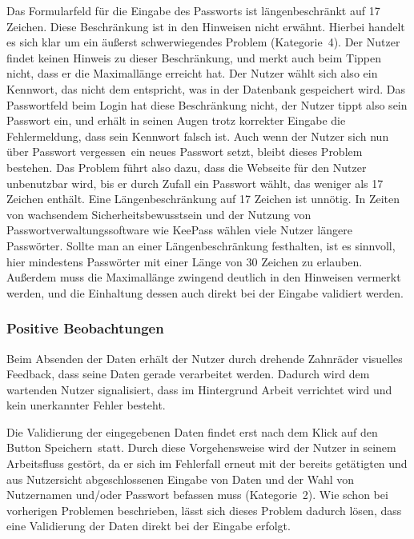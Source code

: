 {
Das Formularfeld für die Eingabe des Passworts ist längenbeschränkt auf 17 Zeichen. Diese Beschränkung ist in den Hinweisen nicht erwähnt.
}
{
Hierbei handelt es sich klar um ein äußerst schwerwiegendes Problem (Kategorie~4). Der Nutzer findet keinen Hinweis zu dieser Beschränkung, und merkt auch beim Tippen nicht, dass er die Maximallänge erreicht hat. Der Nutzer wählt sich also ein Kennwort, das nicht dem entspricht, was in der Datenbank gespeichert wird. Das Passwortfeld beim Login hat diese Beschränkung nicht, der Nutzer tippt also sein Passwort ein, und erhält in seinen Augen trotz korrekter Eingabe die Fehlermeldung, dass sein Kennwort falsch ist. Auch wenn der Nutzer sich nun über \glqq Passwort vergessen\grqq ~ein neues Passwort setzt, bleibt dieses Problem bestehen. Das Problem führt also dazu, dass die Webseite für den Nutzer unbenutzbar wird, bis er durch Zufall ein Passwort wählt, das weniger als 17 Zeichen enthält.
}
{
Eine Längenbeschränkung auf 17 Zeichen ist unnötig. In Zeiten von wachsendem Sicherheitsbewusstsein und der Nutzung von Passwortverwaltungssoftware wie KeePass wählen viele Nutzer längere Passwörter. Sollte man an einer Längenbeschränkung festhalten, ist es sinnvoll, hier mindestens Passwörter mit einer Länge von 30 Zeichen zu erlauben. Außerdem muss die Maximallänge zwingend deutlich in den Hinweisen vermerkt werden, und die Einhaltung dessen auch direkt bei der Eingabe validiert werden.
}
\label{prob:frei:passwortlaenge}


\subsubsection*{Positive Beobachtungen}
\label{subsubsec:freischaltung_absenden_positiv}
Beim Absenden der Daten erhält der Nutzer durch drehende Zahnräder visuelles Feedback, dass seine Daten gerade verarbeitet werden. Dadurch wird dem wartenden Nutzer signalisiert, dass im Hintergrund Arbeit verrichtet wird und kein unerkannter Fehler besteht.

{
Die Validierung der eingegebenen Daten findet erst nach dem Klick auf den Button \glqq Speichern\grqq ~statt.
}
{
Durch diese Vorgehensweise wird der Nutzer in seinem Arbeitsfluss gestört, da er sich im Fehlerfall erneut mit der bereits getätigten und aus Nutzersicht abgeschlossenen Eingabe von Daten und der Wahl von Nutzernamen und/oder Passwort befassen muss (Kategorie~2).
}
{
Wie schon bei vorherigen Problemen beschrieben, lässt sich dieses Problem dadurch lösen, dass eine Validierung der Daten direkt bei der Eingabe erfolgt.
}
\label{prob:frei:validierung}

